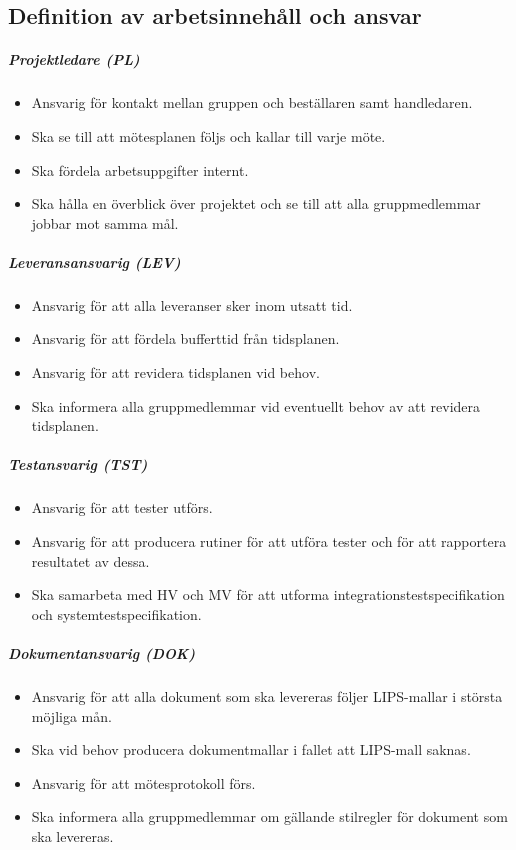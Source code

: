 \documentclass[a4paper,11pt]{article}
\begin{document}
\subsection{Definition av arbetsinnehåll och ansvar}
\subparagraph{Projektledare (PL)}
\begin{itemize}
\item Ansvarig för kontakt mellan gruppen och beställaren samt handledaren.
\item Ska se till att mötesplanen följs och kallar till varje möte.
\item Ska fördela arbetsuppgifter internt.
\item Ska hålla en överblick över projektet och se till att alla gruppmedlemmar jobbar mot samma mål.
\end{itemize}

\subparagraph{Leveransansvarig (LEV)}
\begin{itemize}
\item Ansvarig för att alla leveranser sker inom utsatt tid.
\item Ansvarig för att fördela bufferttid från tidsplanen.
\item Ansvarig för att revidera tidsplanen vid behov.
\item Ska informera alla gruppmedlemmar vid eventuellt behov av att revidera tidsplanen.
\end{itemize}

\subparagraph{Testansvarig (TST)}
\begin{itemize}
\item Ansvarig för att tester utförs.
\item Ansvarig för att producera rutiner för att utföra tester och för att rapportera resultatet av dessa.
\item Ska samarbeta med HV och MV för att utforma integrationstestspecifikation och systemtestspecifikation. 
\end{itemize}

\subparagraph{Dokumentansvarig (DOK)}
\begin{itemize}
\item Ansvarig för att alla dokument som ska levereras följer LIPS-mallar i största möjliga mån.
\item Ska vid behov producera dokumentmallar i fallet att LIPS-mall saknas.
\item Ansvarig för att mötesprotokoll förs.
\item Ska informera alla gruppmedlemmar om gällande stilregler för dokument som ska levereras.
\end{itemize}
\end{document}

